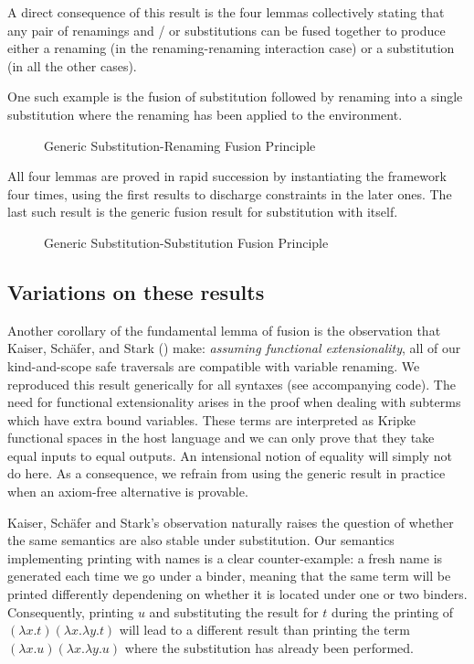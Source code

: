 A direct consequence of this result is the four lemmas collectively stating
that any pair of renamings and / or substitutions can be fused together to
produce either a renaming (in the renaming-renaming interaction case) or a
substitution (in all the other cases).

One such example is the fusion of substitution followed by renaming into a
single substitution where the renaming has been applied to the environment.

\begin{figure}[h]
\caption{Generic Substitution-Renaming Fusion Principle\label{defn:SubRen-Fusion}}
\end{figure}

All four lemmas are proved in rapid succession by instantiating the 
framework four times, using the first results to discharge constraints in the
later ones. The last such result is the generic fusion result for substitution
with itself.

\begin{figure}[h]
\caption{Generic Substitution-Substitution Fusion Principle}
\end{figure}

\subsection{Variations on these results}

Another corollary of the fundamental lemma of fusion is the observation that
Kaiser, Schäfer, and Stark (\citeyear{Kaiser-wsdebr}) make: \emph{assuming
functional extensionality}, all of our kind-and-scope safe traversals are
compatible with variable renaming.
%
We reproduced this result generically for all syntaxes (see accompanying code).
The need for functional extensionality arises in the proof when dealing with
subterms which have extra bound variables. These terms are interpreted as
Kripke functional spaces in the host language and we can only prove that they
take equal inputs to equal outputs. An intensional notion of equality will
simply not do here.
%
As a consequence, we refrain from using the generic result in practice when
an axiom-free alternative is provable.


Kaiser, Schäfer and Stark's observation naturally raises the question of whether
the same semantics are also stable under substitution.
%
Our semantics implementing printing with names is a clear counter-example: a
fresh name is generated each time we go under a binder, meaning that the same
term will be printed differently dependening on whether it is located under
one or two binders.
%
Consequently, printing $u$ and substituting the result for $t$ during the
printing of $(λx.t)(λx.λy.t)$ will lead to a different result than printing
the term $(λx.u)(λx.λy.u)$ where the substitution has already been performed.
